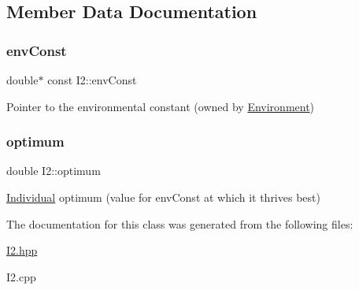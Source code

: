 \subsection{Member Data Documentation}
\hypertarget{classI2_a16f94b60e5a6c02c67a46500798fd7cf}{}\label{classI2_a16f94b60e5a6c02c67a46500798fd7cf} 
\subsubsection{\texorpdfstring{env\+Const}{envConst}}
{\footnotesize\ttfamily double$\ast$ const I2\+::env\+Const}

Pointer to the environmental constant (owned by \hyperlink{classEnvironment}{Environment}) \hypertarget{classI2_a5f022bb4d32b5ee96e117b72e17b262a}{}\label{classI2_a5f022bb4d32b5ee96e117b72e17b262a} 
\subsubsection{\texorpdfstring{optimum}{optimum}}
{\footnotesize\ttfamily double I2\+::optimum}

\hyperlink{classIndividual}{Individual} optimum (value for env\+Const at which it thrives best) 

The documentation for this class was generated from the following files\+:\begin{DoxyCompactItemize}
\item 
\hyperlink{I2_8hpp}{I2.\+hpp}\item 
I2.\+cpp\end{DoxyCompactItemize}
